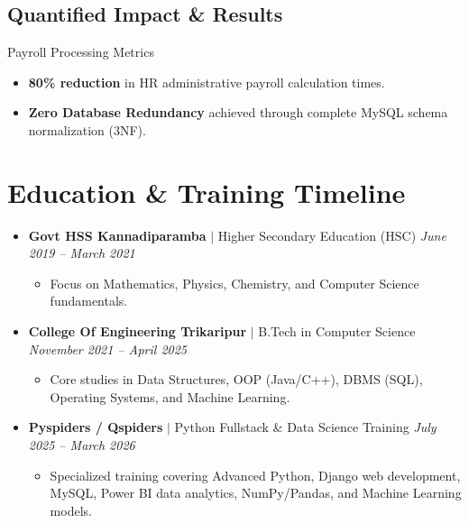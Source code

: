 \documentclass[11pt,letterpaper]{article}
\begin{document}
\subsection{Quantified Impact \& Results}
\begin{metricbox}{Payroll Processing Metrics}
    \begin{itemize}
        \item \textbf{80\% reduction} in HR administrative payroll calculation times.
        \item \textbf{Zero Database Redundancy} achieved through complete MySQL schema normalization (3NF).
    \end{itemize}
\end{metricbox}

\vspace{0.2in}

\section{Education \& Training Timeline}
\begin{itemize}[leftmargin=0.2in]
    \item \textbf{Govt HSS Kannadiparamba} $|$ Higher Secondary Education (HSC) \hfill \textit{June 2019 -- March 2021}
    \begin{itemize}[label={$\circ$}]
        \item Focus on Mathematics, Physics, Chemistry, and Computer Science fundamentals.
    \end{itemize}
    \item \textbf{College Of Engineering Trikaripur} $|$ B.Tech in Computer Science \hfill \textit{November 2021 -- April 2025}
    \begin{itemize}[label={$\circ$}]
        \item Core studies in Data Structures, OOP (Java/C++), DBMS (SQL), Operating Systems, and Machine Learning.
    \end{itemize}
    \item \textbf{Pyspiders / Qspiders} $|$ Python Fullstack \& Data Science Training \hfill \textit{July 2025 -- March 2026}
    \begin{itemize}[label={$\circ$}]
        \item Specialized training covering Advanced Python, Django web development, MySQL, Power BI data analytics, NumPy/Pandas, and Machine Learning models.
    \end{itemize}
\end{itemize}
\end{document}
